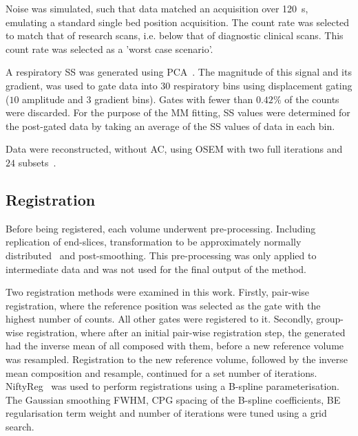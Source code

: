         Noise was simulated, such that data matched an acquisition over \SI{120}{\second}, emulating a standard single bed position acquisition. The count rate was selected to match that of research scans, i.e. below that of diagnostic clinical scans. This count rate was selected as a 'worst case scenario'.
        
        A respiratory \gls{SS} was generated using \gls{PCA}~\cite{Thielemans2011}. The magnitude of this signal and its gradient, was used to gate data into $30$ respiratory bins using displacement gating ($10$ amplitude and $3$ gradient bins). Gates with fewer than $0.42$\% of the counts were discarded. For the purpose of the \gls{MM} fitting, \gls{SS} values were determined for the post-gated data by taking an average of the \gls{SS} values of data in each bin.
        
        Data were reconstructed, without \gls{AC}, using \gls{OSEM} with two full iterations and $24$ subsets~\cite{Hudson1994}.
    
    
    \subsection{Registration} \label{sec:registration}
        Before being registered, each volume underwent pre-processing. Including replication of end-slices, transformation to be approximately normally distributed~\cite{Johnson2013} and post-smoothing. This pre-processing was only applied to intermediate data and was not used for the final output of the method.%
        
        Two registration methods were examined in this work. Firstly, pair-wise registration, where the reference position was selected as the gate with the highest number of counts. All other gates were registered to it. Secondly, group-wise registration, where after an initial pair-wise registration step, the  generated had the inverse mean of all  composed with them, before a new reference volume was resampled. Registration to the new reference volume, followed by the inverse mean composition and resample, continued for a set number of iterations. NiftyReg~\cite{Modat2010} was used to perform registrations using a B-spline parameterisation. The Gaussian smoothing \gls{FWHM}, \acrlong{CPG} spacing of the B-spline coefficients, \acrlong{BE} regularisation term weight and number of iterations were tuned using a grid search.
    
